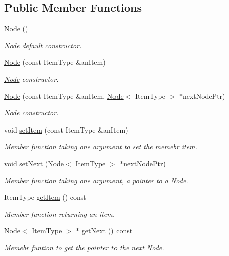 \subsection*{Public Member Functions}
\begin{DoxyCompactItemize}
\item 
\hyperlink{classNode_a627e94f4fba0e73c546e0fb2a7266f36}{Node} ()
\begin{DoxyCompactList}\small\item\em \hyperlink{classNode}{Node} default constructor. \end{DoxyCompactList}\item 
\hyperlink{classNode_a0288598fcb0244739ce95099c26250ae}{Node} (const Item\+Type \&an\+Item)
\begin{DoxyCompactList}\small\item\em \hyperlink{classNode}{Node} constructor. \end{DoxyCompactList}\item 
\hyperlink{classNode_adf98d3f9b7227622cb5a0fdd7e8f0b18}{Node} (const Item\+Type \&an\+Item, \hyperlink{classNode}{Node}$<$ Item\+Type $>$ $\ast$next\+Node\+Ptr)
\begin{DoxyCompactList}\small\item\em \hyperlink{classNode}{Node} constructor. \end{DoxyCompactList}\item 
void \hyperlink{classNode_ab4ceecdecc5df799011de486b9f54974}{set\+Item} (const Item\+Type \&an\+Item)
\begin{DoxyCompactList}\small\item\em Member function taking one argument to set the memebr item. \end{DoxyCompactList}\item 
void \hyperlink{classNode_a01c1a66d4e39f5b149e090413deb4633}{set\+Next} (\hyperlink{classNode}{Node}$<$ Item\+Type $>$ $\ast$next\+Node\+Ptr)
\begin{DoxyCompactList}\small\item\em Member function taking one argument, a pointer to a \hyperlink{classNode}{Node}. \end{DoxyCompactList}\item 
Item\+Type \hyperlink{classNode_a6c08caef312b6f2f69b5e090cf047514}{get\+Item} () const
\begin{DoxyCompactList}\small\item\em Member function returning an item. \end{DoxyCompactList}\item 
\hyperlink{classNode}{Node}$<$ Item\+Type $>$ $\ast$ \hyperlink{classNode_a3eb0c96e03a3fd46ea1cff4c305bbedd}{get\+Next} () const
\begin{DoxyCompactList}\small\item\em Memebr funtion to get the pointer to the next \hyperlink{classNode}{Node}. \end{DoxyCompactList}\end{DoxyCompactItemize}


